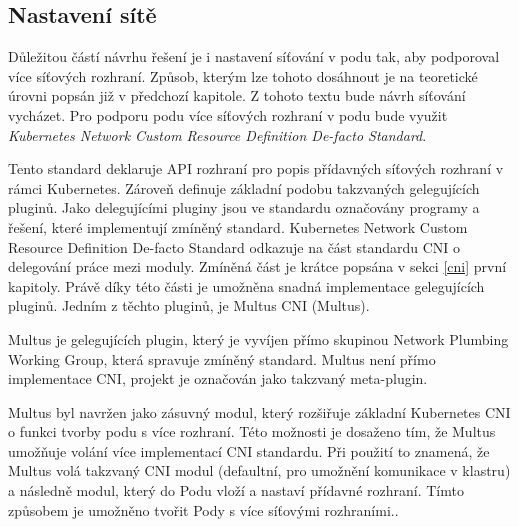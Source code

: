 \subsection{Nastavení sítě}\label{sec:multus}
Důležitou částí návrhu řešení je i nastavení síťování v podu tak, aby podporoval více síťových rozhraní. Způsob, kterým lze tohoto dosáhnout je na teoretické úrovni popsán již v předchozí kapitole. Z tohoto textu bude návrh síťování vycházet. Pro podporu podu více síťových rozhraní v podu bude využit \textit{Kubernetes Network Custom Resource Definition De-facto Standard}.   

Tento standard deklaruje API rozhraní pro popis přídavných síťových rozhraní v rámci Kubernetes. Zároveň definuje základní podobu takzvaných gelegujících pluginů. Jako delegujícími pluginy jsou ve standardu označovány programy a řešení, které implementují zmíněný standard. Kubernetes Network Custom Resource Definition De-facto Standard odkazuje na část standardu CNI o delegování práce mezi moduly. Zmíněná část je krátce popsána v sekci \ref{cni}  první kapitoly. Právě díky této části je umožněna snadná implementace gelegujících pluginů. Jedním z těchto pluginů, je Multus CNI (Multus). 



Multus je gelegujících plugin, který je vyvíjen přímo skupinou Network Plumbing Working Group, která spravuje zmíněný standard. Multus není přímo implementace CNI, projekt je označován jako takzvaný meta-plugin. \cite{hayashi_2019_multuscni}

Multus byl navržen jako zásuvný modul, který rozšiřuje základní Kubernetes CNI o funkci tvorby podu s více rozhraní. Této možnosti je dosaženo tím, že Multus umožňuje volání více implementací CNI standardu. Při použití to znamená, že Multus volá takzvaný  CNI modul (defaultní, pro umožnění komunikace v klastru) a následně  modul, který do Podu vloží a nastaví přídavné rozhraní. Tímto způsobem je umožněno tvořit Pody s více síťovými rozhraními.. \cite{hayashi_2019_multuscni}

